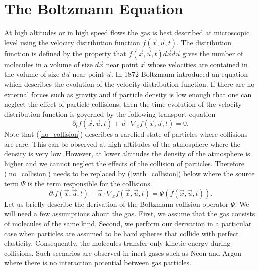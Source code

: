 \section{The Boltzmann Equation}
At high altitudes or in high speed flows the gas is best described at microscopic level using the velocity distribution function $f(\vec{x},\vec{u},t)$. The distribution function is defined by the property that $f(\vec{x},\vec{u},t)d\vec{x} d\vec{u}$ gives the number of molecules in a volume of size $d\vec{x}$ near point $\vec{x}$ whose velocities are contained in the volume of size $d\vec{u}$ near point $\vec{u}$. In 1872 Boltzmann \cite{boltzmann} introduced an equation which describes the evolution of the velocity distribution function. If there are no external forces such as gravity and if particle density is low enough that one can neglect the effect of particle collisions, then the time evolution of the velocity distribution function is governed by the following transport equation
%
\begin{equation}
\label{no_collision}
\partial_t f(\vec{x},\vec{u},t) + \vec{u} \cdot \nabla_x f(\vec{x},\vec{u},t) = 0.
\end{equation}
%
Note that (\ref{no_collision}) describes a rarefied state of particles where collisions are rare. This can be observed at high altitudes of the atmosphere where the density is very low. However, at lower altitudes the density of the atmosphere is higher and we cannot neglect the effects of the collision of particles. Therefore (\ref{no_collision}) needs to be replaced by (\ref{with_collision}) below where the source term $\Psi$ is the term responsible for the collisions.
%
\begin{equation}
\label{with_collision}
\partial_t f(\vec{x},\vec{u},t) + \vec{u} \cdot \nabla_x f(\vec{x},\vec{u},t) = \Psi(f(\vec{x},\vec{u},t)).
\end{equation}
%
Let us briefly describe the derivation of the Boltzmann collision operator $\Psi$. We will need a few assumptions about the gas. First, we assume that the gas consists of molecules of the same kind. Second, we perform our derivation in a particular case when particles are assumed to be hard spheres that collide with perfect elasticity. Consequently, the molecules transfer only kinetic energy during collisions. Such scenarios are observed in inert gases such as Neon and Argon where there is no interaction potential between gas particles.

